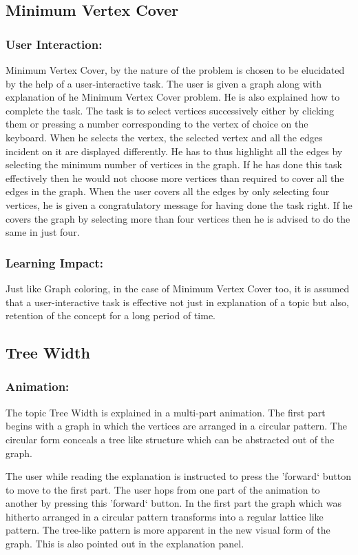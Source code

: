 \subsection{Minimum Vertex Cover}
\subsubsection{User Interaction:}
Minimum Vertex Cover, by the nature of the problem is chosen to be
elucidated by the help of a user-interactive task. The user is given a graph
along with explanation of he Minimum Vertex Cover problem. He is also explained
how to complete the task. The task is to select vertices successively either by
clicking them or pressing a number corresponding to the vertex of choice on the
keyboard.  When he selects the vertex, the selected vertex and all the edges
incident on it are displayed differently. He has to thus highlight all the
edges by selecting the minimum number of vertices in the graph.  If he has done
this task effectively then he would not choose more vertices than required to
cover all the edges in the graph. When the user covers all the edges by only
selecting four vertices, he is given a congratulatory message for having done
the task right. If he covers the graph by selecting more than four vertices
then he is advised to do the same in just four.

\subsubsection{Learning Impact:}
Just like Graph coloring, in the case of Minimum Vertex Cover too, it is
assumed that a user-interactive task is effective not just in explanation of a
topic but also, retention of the concept for a long period of time.

\subsection{Tree Width}
\subsubsection{Animation:}
The topic Tree Width is explained in a multi-part animation. The first part
begins with a graph in which the vertices are arranged in a circular pattern.
The circular form conceals a tree like structure which can be abstracted out of
the graph. 

The user while reading the explanation is instructed to press the 'forward`
button to move to the first part. The user hops from one part of the animation
to another by pressing this 'forward` button.  In the first part the graph
which was hitherto arranged in a circular pattern transforms into a regular
lattice like pattern. The tree-like pattern is more apparent in the new visual
form of the graph.  This is also pointed out in the explanation panel.  

